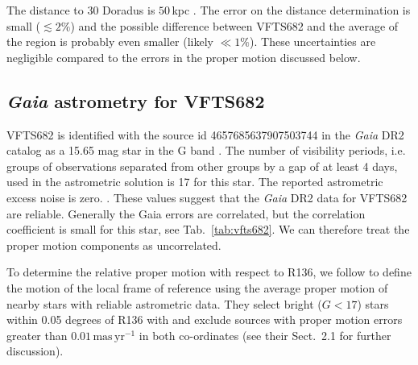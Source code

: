 \documentclass[apjl,twocolumn]{emulateapj}
\newcommand{\SdM}[1]{{{\color{brown}{#1}}}}
\newcommand{\Msun}{{\,\mathrm{M}_\odot}}
\newcommand{\masyr}{\,\mathrm{mas}\,\mathrm{yr}^{-1}}
\begin{document}



The distance to 30 Doradus is $50$\,kpc  \citep[][]{pietrzynski:13}. The error on the distance determination is small ($\lesssim2\%$) and the possible difference between VFTS682 and the average of the region is probably even smaller (likely $\ll 1\%$). These uncertainties are negligible compared to the errors in the proper motion discussed below.  




\subsection{ \emph{Gaia} astrometry for VFTS682\label{data:gaia}}



VFTS682 is identified with the source id 4657685637907503744 in the \emph{Gaia} DR2 catalog  as a 15.65 mag star in the G band \citep{Gaia-Collaboration+2016a, Gaia-Collaboration+2018}.   The number of visibility periods, i.e. groups of observations separated from other groups by a gap of at least 4 days, used in the astrometric solution is 17 for this star. The reported astrometric excess noise is zero. \citep[][]{lindengren:18}.  These values suggest that the \emph{Gaia} DR2  data for VFTS682 are reliable. Generally the Gaia errors are correlated, but the correlation coefficient is small for this star, see Tab.~\ref{tab:vfts682}. We can therefore treat the proper motion components as uncorrelated.

To determine the relative proper motion with respect to R136, we follow  \citet{lennon:18} to define the motion of the local frame of reference using the average proper motion of nearby stars with reliable astrometric data.  They select  bright ($G<17$) stars within 0.05 degrees of R136 with and exclude sources with proper motion errors greater than $0.01\masyr$ in both co-ordinates (see their  Sect.~2.1 for further discussion).  
\end{document}
